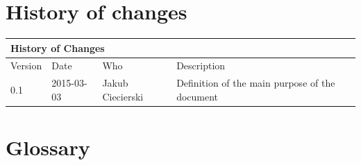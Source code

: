 \documentclass{article}
\begin{document}
\section*{History of changes}

\begin{table}[h]
\hspace*{-2.1cm}
\large
\begin{tabular}{|l|l|l|l|}
\hline
\multicolumn{4}{|l|}{\cellcolor[HTML]{C0C0C0}History of Changes} \\ \hline
Version         & Date         & Who        & Description        \\ \hline
0.1         & 2015-03-03         & Jakub Ciecierski        & Definition of the main purpose of the document       \\ \hline
\end{tabular}
\end{table}


\newpage
\section{Glossary}


\end{document}
